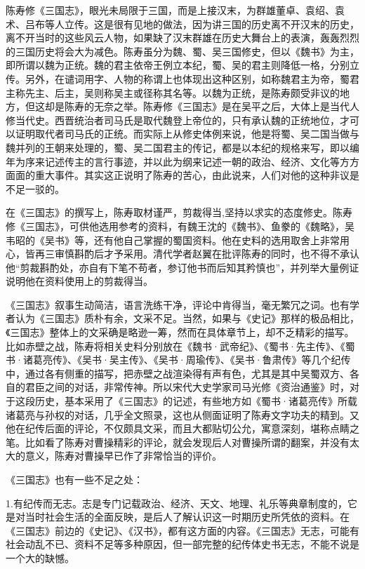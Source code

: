 \documentclass[12pt,UTF8]{ctexbook}
\begin{document}
陈寿修《三国志》，眼光未局限于三国，而是上接汉末，为群雄董卓、袁绍、袁术、吕布等人立传。这是很有见地的做法，因为讲三国的历史离不开汉末的历史，离不开当时的这些风云人物，如果缺了汉末群雄在历史大舞台上的表演，轰轰烈烈的三国历史将会大为减色。陈寿虽分为魏、蜀、吴三国修史，但以《魏书》为主，即所谓以魏为正统。魏的君主依帝王例立本纪，蜀、吴的君主则降低一格，分别立传。另外，在谴词用字、人物的称谓上也体现出这种区别，如称魏君主为帝，蜀君主称先主、后主，吴则称吴主或径称其名等。以魏为正统，是陈寿颇受非议的地方，但这却是陈寿的无奈之举。陈寿修《三国志》是在吴平之后，大体上是当代人修当代史。西晋统治者司马氏是取代魏登上帝位的，只有承认魏的正统地位，才可以证明取代者司马氏的正统。而实际上从修史体例来说，他是将蜀、吴二国当做与魏并列的王朝来处理的，蜀、吴二国君主的传记，都是以本纪的规格来写，即以编年为序来记述传主的言行事迹，并以此为纲来记述一朝的政治、经济、文化等方方面面的重大事件。其实这正说明了陈寿的苦心，由此说来，人们对他的这种非议是不足一驳的。

在《三国志》的撰写上，陈寿取材谨严，剪裁得当,坚持以求实的态度修史。陈寿修《三国志》，可供他选用参考的资料，有魏王沈的《魏书》、鱼豢的《魏略》，吴韦昭的《吴书》等，还有他自己掌握的蜀国资料。他在史料的选用取舍上非常用心，皆再三审慎斟酌后才予采用。清代学者赵翼在批评陈寿的同时，也不得不承认他“剪裁斟酌处，亦自有下笔不苟者，参订他书而后知其矜慎也”，并列举大量例证说明他在资料使用上的剪裁得当。

《三国志》叙事生动简洁，语言洗练干净，评论中肯得当，毫无繁冗之词。也有学者认为《三国志》质朴有余，文采不足。当然，如果与《史记》那样的极品相比，《三国志》整体上的文采确是略逊一筹，然而在具体章节上，却不乏精彩的描写。比如赤壁之战，陈寿将相关史料分别放在《魏书·武帝纪》、《蜀书·先主传》、《蜀书·诸葛亮传》、《吴书·吴主传》、《吴书·周瑜传》、《吴书·鲁肃传》等几个纪传中，通过各有侧重的描写，把赤壁之战渲染得有声有色，尤其是其中吴蜀双方、各自的君臣之间的对话，非常传神。所以宋代大史学家司马光修《资治通鉴》时，对于这段历史，基本采用了《三国志》的记述，有些地方如《蜀书·诸葛亮传》所载诸葛亮与孙权的对话，几乎全文照录，这也从侧面证明了陈寿文字功夫的精到。又他在纪传后面的评论，不仅颇具文采，而且大都贴切公允，寓意深刻，堪称点睛之笔。比如看了陈寿对曹操精彩的评论，就会发现后人对曹操所谓的翻案，并没有太大的意义，陈寿对曹操早已作了非常恰当的评价。

《三国志》也有一些不足之处：

1.有纪传而无志。志是专门记载政治、经济、天文、地理、礼乐等典章制度的，它是对当时社会生活的全面反映，是后人了解认识这一时期历史所凭依的资料。在《三国志》前边的《史记》、《汉书》，都有这方面的内容。《三国志》无志，可能有社会动乱不已、资料不足等多种原因，但一部完整的纪传体史书无志，不能不说是一个大的缺憾。
\end{document}
